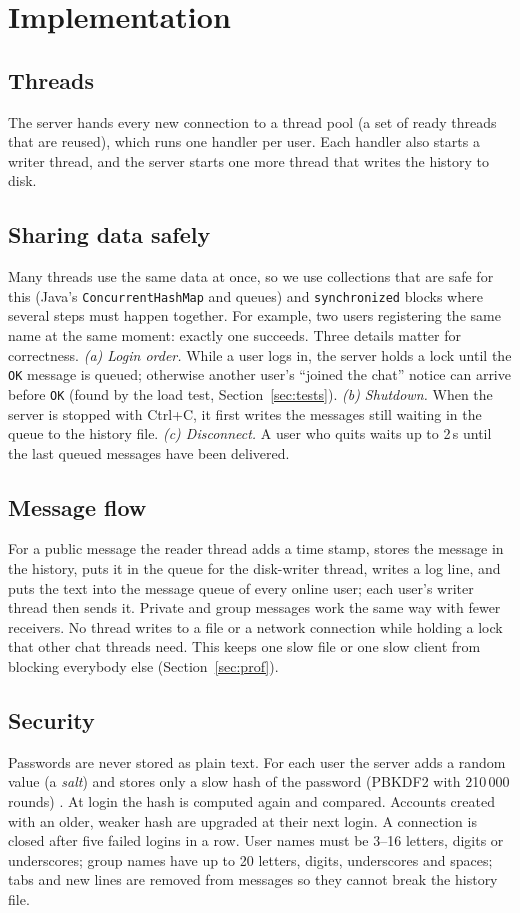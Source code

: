 \documentclass[conference]{IEEEtran}
\newcommand{\code}[1]{\texttt{#1}}
\begin{document}
\section{Implementation}

\subsection{Threads}
The server hands every new connection to a thread pool (a set of ready threads that are reused), which runs one handler per user.
Each handler also starts a writer thread, and the server starts one more thread that writes the history to disk.

\subsection{Sharing data safely}
Many threads use the same data at once, so we use collections that are safe for this (Java's \code{ConcurrentHashMap} and queues) and \code{synchronized} blocks where several steps must happen together.
For example, two users registering the same name at the same moment: exactly one succeeds. Three details matter for correctness.
\emph{(a) Login order.} While a user logs in, the server holds a lock until the \code{OK} message is queued; otherwise another user's ``joined the chat'' notice can arrive before \code{OK} (found by the load test, Section~\ref{sec:tests}).
\emph{(b) Shutdown.} When the server is stopped with Ctrl+C, it first writes the messages still waiting in the queue to the history file.
\emph{(c) Disconnect.} A user who quits waits up to 2\,s until the last queued messages have been delivered.

\subsection{Message flow}
For a public message the reader thread adds a time stamp, stores the message in the history, puts it in the queue for the disk-writer thread, writes a log line, and puts the text into the message queue of every online user; each user's writer thread then sends it.
Private and group messages work the same way with fewer receivers.
No thread writes to a file or a network connection while holding a lock that other chat threads need. This keeps one slow file or one slow client from blocking everybody else (Section~\ref{sec:prof}).

\subsection{Security}
Passwords are never stored as plain text. For each user the server adds a random value (a \emph{salt}) and stores only a slow hash of the password (PBKDF2 with 210\,000 rounds) \cite{rfc8018}.
At login the hash is computed again and compared. Accounts created with an older, weaker hash are upgraded at their next login. A connection is closed after five failed logins in a row.
User names must be 3--16 letters, digits or underscores; group names have up to 20 letters, digits, underscores and spaces; tabs and new lines are removed from messages so they cannot break the history file.
\end{document}
